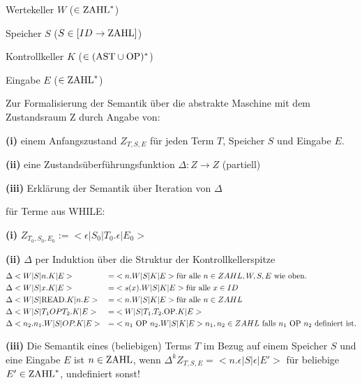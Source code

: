 \begin{compactitem}
\begin{compactitem}
			\begin{compactitem}
				\item Wertekeller $W$ ($\in \text{\lstinline!ZAHL!}^*$)
				\item Speicher $S$ ($S \in [ID \rightarrow \text{\lstinline!ZAHL!}]$)
				\item Kontrollkeller $K$ ($ \in (\text{\lstinline!AST!} \cup \text{\lstinline!OP!})^*$)
				\item Eingabe $E$ ($\in \text{\lstinline!ZAHL!}^*$)
			\end{compactitem}
	\end{compactitem}
		Zur Formalisierung der Semantik über die abstrakte Maschine mit dem Zustandsraum Z durch Angabe von:
		\begin{compactitem}
			\item[\textbf{(i)}] einem Anfangszustand $Z_{T,S,E}$ für jeden Term $T$, Speicher $S$ und Eingabe $E$.
			\item[\textbf{(ii)}] eine Zustandsüberführungsfunktion $\Delta : Z \rightarrow Z$ (partiell)
			\item[\textbf{(iii)}] Erklärung der Semantik über Iteration von $\Delta$\\		
		\end{compactitem}
		für Terme aus WHILE:
			\begin{compactitem}
				\item[\textbf{(i)}]	$Z_{T_0,S_0,E_0} := <\epsilon|S_0|T_0.\epsilon|E_0>$
				\item[\textbf{(ii)}] $\Delta$ per Induktion über die Struktur der Kontrollkellerspitze\\
					\begin{align*}
						&\Delta <W|S|n.K|E> &= &<n.W|S|K|E> \text{für alle } n \in ZAHL, W,S,E \text{ wie oben.}\\
						&\Delta <W|S|x.K|E> &= &<s(x).W|S|K|E> \text{für alle } x \in ID\\
						&\Delta <W|S|\text{\lstinline!READ!}.K|n.E> &= &<n.W|S|K|E> \text{für alle } n \in ZAHL\\
						&\Delta <W|S|T_1 OP T_2.K|E> &= &<W|S|T_1.T_2.\text{\lstinline!OP!}.K|E> \\
						&\Delta <n_2.n_1.W|S|OP.K|E> &= &<n_1\ \text{\lstinline!OP!}\ n_2.W|S|K|E> n_1, n_2 \in ZAHL \text{ falls } n_1\ \text{\lstinline!OP!}\ n_2 \text{ definiert ist.}\\
					\end{align*}
				\item[\textbf{(iii)}] Die Semantik eines (beliebigen) Terms $T$ im Bezug auf einem Speicher $S$ und eine Eingabe $E$ ist $n \in \text{\lstinline!ZAHL!}$, wenn $\Delta^k Z_{T,S,E} = <n.\epsilon|S|\epsilon|E'>$ für beliebige $E' \in \text{\lstinline!ZAHL!}^*$, undefiniert sonst!\\ 		
			\end{compactitem}		
\end{compactitem}

